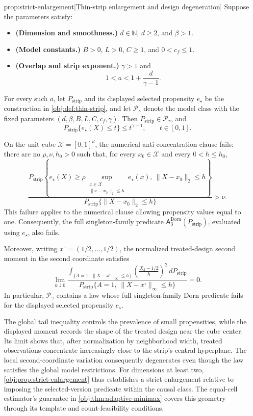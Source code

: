 \begin{propositionv}{prop:strict-enlargement}[Thin-strip enlargement and design degeneration]
Suppose the parameters satisfy:
\begin{itemize}
\item \textbf{(Dimension and smoothness.)} \(d\in\mathbb N\), \(d\ge2\), and \(\beta>1\).
\item \textbf{(Model constants.)} \(B>0\), \(L>0\), \(C\ge1\), and \(0<c_f\le1\).
\item \textbf{(Overlap and strip exponent.)} \(\gamma>1\) and
\[
1<a<1+\frac{d}{\gamma-1}.
\]
\end{itemize}
For every such \(a\), let \(P_{\mathrm{strip}}\) and its displayed selected propensity \(e_\star\) be the construction in \cref{obj:def:thin-strip}, and let \(\mathcal P_\gamma\) denote the model class with the fixed parameters \((d,\beta,B,L,C,c_f,\gamma)\). Then \(P_{\mathrm{strip}}\in\mathcal P_\gamma\), and
\[
P_{\mathrm{strip}}\{e_\star(X)\le t\}\le t^{\gamma-1},
\qquad t\in[0,1].
\]

On the unit cube \(\mathcal X=[0,1]^d\), the numerical anti-concentration clause fails: there are no \(\rho,\nu,h_0>0\) such that, for every \(x_0\in\mathcal X\) and every \(0<h\le h_0\),
\[
\frac{
P_{\mathrm{strip}}\!\left\{
e_\star(X)\ge
\rho\sup_{\substack{x\in\mathcal X\\ \|x-x_0\|_2\le h}}e_\star(x),
\ \|X-x_0\|_2\le h
\right\}
}{
P_{\mathrm{strip}}\{\|X-x_0\|_2\le h\}
}
>\nu.
\]
This failure applies to the numerical clause allowing propensity values equal to one. Consequently, the full singleton-family predicate
\(\mathsf A_{3}^{\mathrm{Dorn}}(P_{\mathrm{strip}})\), evaluated using \(e_\star\), also fails.

Moreover, writing \(x^\circ=(1/2,\ldots,1/2)\), the normalized treated-design second moment in the second coordinate satisfies
\[
\lim_{h\downarrow0}
\frac{
\displaystyle
\int_{\{A=1,\ \|X-x^\circ\|_\infty\le h\}}
\left(\frac{X_2-1/2}{h}\right)^2
\,dP_{\mathrm{strip}}
}{
P_{\mathrm{strip}}\{A=1,\ \|X-x^\circ\|_\infty\le h\}
}
=0.
\]
In particular, \(\mathcal P_\gamma\) contains a law whose full singleton-family Dorn predicate fails for the displayed selected propensity \(e_\star\).
\end{propositionv}

The global tail inequality controls the prevalence of small propensities, while the displayed moment records the shape of the treated design near the cube center. Its limit shows that, after normalization by neighborhood width, treated observations concentrate increasingly close to the strip's central hyperplane. The local second-coordinate variation consequently degenerates even though the law satisfies the global model restrictions. For dimensions at least two, \cref{obj:prop:strict-enlargement} thus establishes a strict enlargement relative to imposing the selected-version predicate within the causal class. The equal-cell estimator's guarantee in \cref{obj:thm:adaptive-minimax} covers this geometry through its template and count-feasibility conditions.

